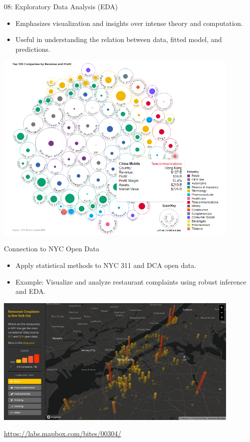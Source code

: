 \documentclass{beamer}
\begin{document}
\begin{frame}{08: Exploratory Data Analysis (EDA)}
\begin{itemize}
    \item Emphasizes visualization and insights over intense theory and computation.
    \item Useful in understanding the relation between data, fitted model, and predictions.
\end{itemize}

\includegraphics[width=0.9\textwidth]{bubble-chart.png}
\end{frame}

\begin{frame}{Connection to NYC Open Data}
\begin{itemize}
    \item Apply statistical methods to NYC 311 and DCA open data.
    \item Example: Visualize and analyze restaurant complaints using robust inference and EDA.
\end{itemize}

\begin{center}
  \includegraphics[width=0.9\textwidth]{nyc-open-data.png}
\end{center}

\begin{center}
    \small \url{https://labs.mapbox.com/bites/00304/}
\end{center}
\end{frame}
\end{document}
